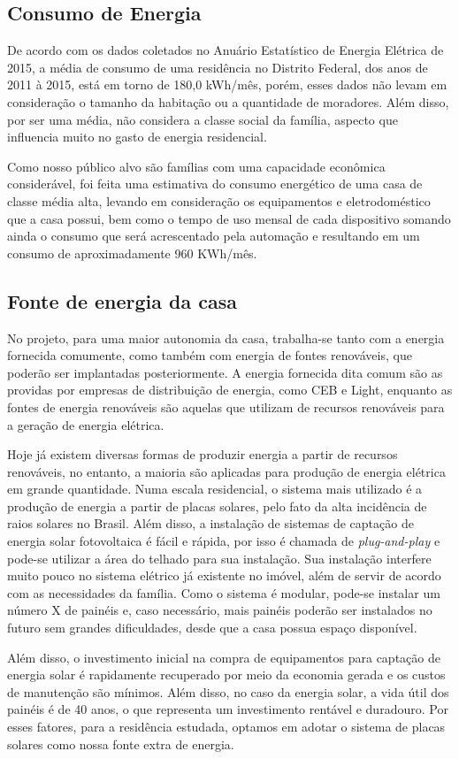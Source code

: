 \subsection{Consumo de Energia}
\par De acordo com os dados coletados no Anuário Estatístico de Energia Elétrica de 2015, a média de consumo de uma residência no Distrito Federal, dos anos de 2011 à 2015, está em torno de 180,0 kWh/mês, porém, esses dados não levam em consideração o tamanho da habitação ou a quantidade de moradores. Além disso, por ser uma média, não considera a classe social da família, aspecto que influencia muito no gasto de energia residencial.
\par Como nosso público alvo são famílias com uma capacidade econômica considerável, foi feita uma estimativa do consumo energético de uma casa de classe média alta, levando em consideração os equipamentos e eletrodoméstico que a casa possui, bem como o tempo de uso mensal de cada dispositivo somando ainda o consumo que será acrescentado pela automação e resultando em um consumo de aproximadamente 960 KWh/mês.

\subsection{Fonte de energia da casa}
\par No projeto, para uma maior autonomia da casa, trabalha-se tanto com a energia fornecida comumente, como também com energia de fontes renováveis, que poderão ser implantadas posteriormente. A energia fornecida dita comum são as providas por empresas de distribuição de energia, como CEB e Light, enquanto as fontes de energia renováveis são aquelas que utilizam de recursos renováveis para a geração de energia elétrica.
\par Hoje já existem diversas formas de produzir energia a partir de recursos renováveis, no entanto, a maioria são aplicadas para produção de energia elétrica em grande quantidade. Numa escala residencial, o sistema mais utilizado é a produção de energia a partir de placas solares, pelo fato da alta incidência de raios solares no Brasil. Além disso, a instalação de sistemas de captação de energia solar fotovoltaica é fácil e rápida, por isso é chamada de \textit{plug-and-play} e pode-se utilizar a área do telhado para sua instalação. Sua instalação interfere muito pouco no sistema elétrico já existente no imóvel, além de servir de acordo com as necessidades da família. Como o sistema é modular, pode-se instalar um número X de painéis e, caso necessário, mais painéis poderão ser instalados no futuro sem grandes dificuldades, desde que a casa possua espaço disponível.
\par Além disso, o investimento inicial na compra de equipamentos para captação de energia solar é rapidamente recuperado por meio da economia gerada e os custos de manutenção são mínimos. Além disso, no caso da energia solar, a vida útil dos painéis é de 40 anos, o que representa um investimento rentável e duradouro. Por esses fatores, para a residência estudada, optamos em adotar o sistema de placas solares como nossa fonte extra de energia.


